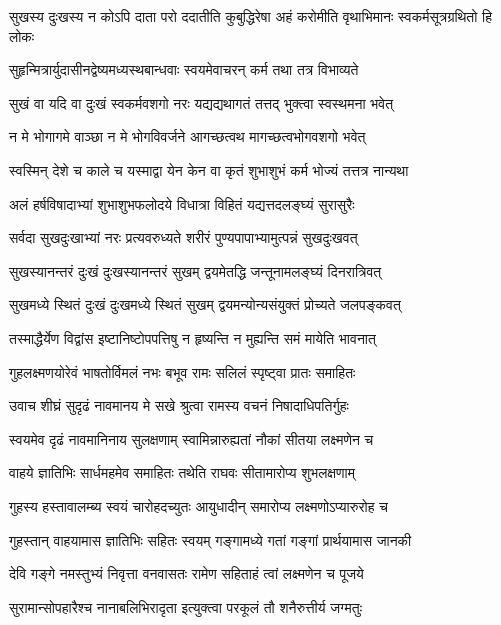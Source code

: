 \fourlineindentedshloka
{सुखस्य दुःखस्य न कोऽपि दाता}
{परो ददातीति कुबुद्धिरेषा}
{अहं करोमीति वृथाभिमानः}
{स्वकर्मसूत्रग्रथितो हि लोकः} %

\twolineshloka
{सुहृन्मित्रार्युदासीनद्वेष्यमध्यस्थबान्धवाः}
{स्वयमेवाचरन् कर्म तथा तत्र विभाव्यते} %

\twolineshloka
{सुखं वा यदि वा दुःखं स्वकर्मवशगो नरः}
{यद्यद्यथागतं तत्तद् भुक्त्वा स्वस्थमना भवेत्} %

\twolineshloka
{न मे भोगागमे वाञ्छा न मे भोगविवर्जने}
{आगच्छत्वथ मागच्छत्वभोगवशगो भवेत्} %

\twolineshloka
{स्वस्मिन् देशे च काले च यस्माद्वा येन केन वा}
{कृतं शुभाशुभं कर्म भोज्यं तत्तत्र नान्यथा} %

\twolineshloka
{अलं हर्षविषादाभ्यां शुभाशुभफलोदये}
{विधात्रा विहितं यद्यत्तदलङ्घ्यं सुरासुरैः} %

\twolineshloka
{सर्वदा सुखदुःखाभ्यां नरः प्रत्यवरुध्यते}
{शरीरं पुण्यपापाभ्यामुत्पन्नं सुखदुःखवत्} %

\twolineshloka
{सुखस्यानन्तरं दुःखं दुःखस्यानन्तरं सुखम्}
{द्वयमेतद्धि जन्तूनामलङ्घ्यं दिनरात्रिवत्} %

\twolineshloka
{सुखमध्ये स्थितं दुःखं दुःखमध्ये स्थितं सुखम्}
{द्वयमन्योन्यसंयुक्तं प्रोच्यते जलपङ्कवत्} %

\twolineshloka
{तस्माद्धैर्येण विद्वांस इष्टानिष्टोपपत्तिषु}
{न हृष्यन्ति न मुह्यन्ति समं मायेति भावनात्} %

\twolineshloka
{गुहलक्ष्मणयोरेवं भाषतोर्विमलं नभः}
{बभूव रामः सलिलं स्पृष्ट्वा प्रातः समाहितः} %

\twolineshloka
{उवाच शीघ्रं सुदृढं नावमानय मे सखे}
{श्रुत्वा रामस्य वचनं निषादाधिपतिर्गुहः} %

\twolineshloka
{स्वयमेव दृढं नावमानिनाय सुलक्षणाम्}
{स्वामिन्नारुह्यतां नौकां सीतया लक्ष्मणेन च} %

\twolineshloka
{वाहये ज्ञातिभिः सार्धमहमेव समाहितः}
{तथेति राघवः सीतामारोप्य शुभलक्षणाम्} %

\twolineshloka
{गुहस्य हस्तावालम्ब्य स्वयं चारोहदच्युतः}
{आयुधादीन् समारोप्य लक्ष्मणोऽप्यारुरोह च} %

\twolineshloka
{गुहस्तान् वाहयामास ज्ञातिभिः सहितः स्वयम्}
{गङ्गामध्ये गतां गङ्गां प्रार्थयामास जानकी} %

\twolineshloka
{देवि गङ्गे नमस्तुभ्यं निवृत्ता वनवासतः}
{रामेण सहिताहं त्वां लक्ष्मणेन च पूजये} %

\twolineshloka
{सुरामान्सोपहारैश्च नानाबलिभिरादृता}
{इत्युक्त्वा परकूलं तौ शनैरुत्तीर्य जग्मतुः} %

